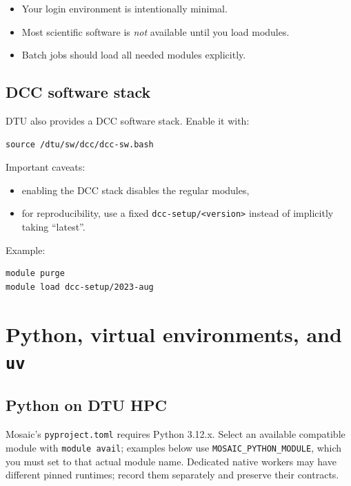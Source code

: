 \documentclass[11pt,a4paper]{article}
\begin{document}
\begin{itemize}[leftmargin=1.5em]
  \item Your login environment is intentionally minimal.
  \item Most scientific software is \emph{not} available until you load modules.
  \item Batch jobs should load all needed modules explicitly.
\end{itemize}

\subsection{DCC software stack}

DTU also provides a DCC software stack. Enable it with:

\begin{lstlisting}[style=shell]
source /dtu/sw/dcc/dcc-sw.bash
\end{lstlisting}

Important caveats:

\begin{itemize}[leftmargin=1.5em]
  \item enabling the DCC stack disables the regular modules,
  \item for reproducibility, use a fixed \texttt{dcc-setup/<version>} instead of implicitly taking ``latest''.
\end{itemize}

Example:

\begin{lstlisting}[style=shell]
module purge
module load dcc-setup/2023-aug
\end{lstlisting}

\section{Python, virtual environments, and \texttt{uv}}

\subsection{Python on DTU HPC}

Mosaic's \texttt{pyproject.toml} requires Python 3.12.x. Select an available
compatible module with \texttt{module avail}; examples below use
\texttt{MOSAIC\_PYTHON\_MODULE}, which you must set to that actual module name.
Dedicated native workers may have different pinned runtimes; record them
separately and preserve their contracts.
\end{document}
